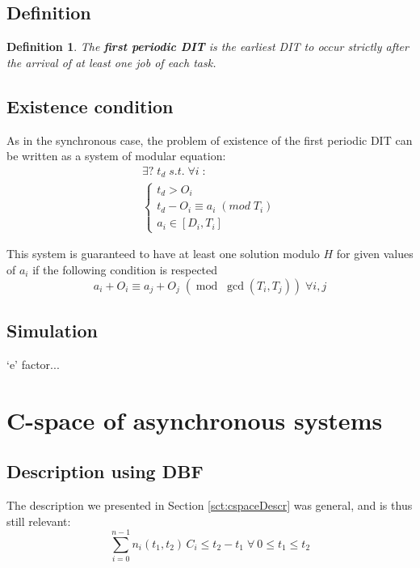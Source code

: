 \documentclass[times, 10pt,twocolumn, a4paper]{article}
\newtheorem{definition}{Definition}
\begin{document}
  \subsection{Definition}

  \begin{definition}
  The \textbf{first periodic DIT} is the earliest DIT to occur strictly after the arrival of at least one job of each task.
  \end{definition}

  \subsection{Existence condition}

As in the synchronous case, the problem of existence of the first periodic DIT can be written as a system of modular equation:
$$
\begin{array}{l}
  \exists ? \; t_d \; s.t. \; \forall i \; :\\
  \left\{
    \begin{array}{l}
    t_d > O_i \\
    t_d - O_i \equiv a_i \; (mod \; T_i) \\
    a_i \in [D_i, T_i]
  \end{array}
\right.
\end{array}
$$

This system is guaranteed to have at least one solution modulo $H$ for given values of $a_i$ if the following condition is respected $$a_i + O_i \equiv a_j + O_j \; (\operatorname{mod} \; \operatorname{gcd}(T_i, T_j)) \; \forall i, j$$

  \subsection{Simulation}

  `e' factor...

\section{C-space of asynchronous systems}
  \label{sct:asyncCspace}

  \subsection{Description using DBF}

  The description we presented in Section \ref{sct:cspaceDescr} was general, and is thus still relevant: $$\sum_{i=0}^{n-1} n_i(t_1, t_2) \, C_i \leq t_2 - t_1 \; \forall \: 0 \leq t_1 \leq t_2$$
\end{document}
